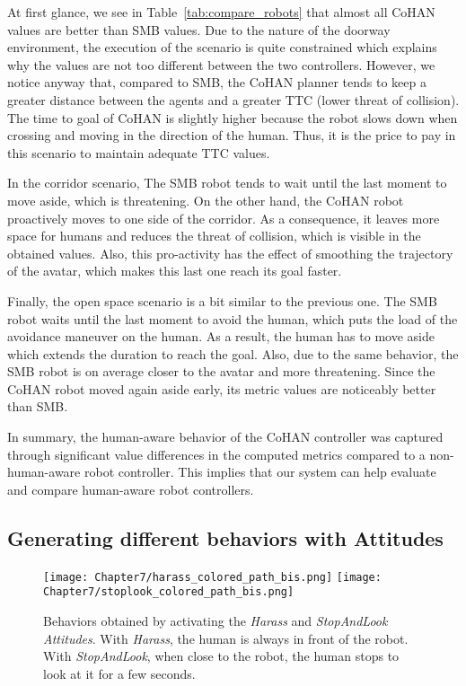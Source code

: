 At first glance, we see in Table~\ref{tab:compare_robots} that almost all CoHAN values are better than SMB values. Due to the nature of the doorway environment, the execution of the scenario is quite constrained which explains why the values are not too different between the two controllers. However, we notice anyway that, compared to SMB, the CoHAN planner tends to keep a greater distance between the agents and a greater TTC (lower threat of collision). The time to goal of CoHAN is slightly higher because the robot slows down when crossing and moving in the direction of the human. Thus, it is the price to pay in this scenario to maintain adequate TTC values.

In the corridor scenario, The SMB robot tends to wait until the last moment to move aside, which is threatening. On the other hand, the CoHAN robot proactively moves to one side of the corridor. As a consequence, it leaves more space for humans and reduces the threat of collision, which is visible in the obtained values. Also, this pro-activity has the effect of smoothing the trajectory of the avatar, which makes this last one reach its goal faster.

Finally, the open space scenario is a bit similar to the previous one. The SMB robot waits until the last moment to avoid the human, which puts the load of the avoidance maneuver on the human. As a result, 
the human has to move aside which extends the duration to reach the goal. Also, due to the same behavior, the SMB robot is on average closer to the avatar and more threatening. Since the CoHAN robot moved again aside early, its metric values are noticeably better than SMB.

In summary, the human-aware behavior of the CoHAN controller was captured through significant value differences in the computed metrics compared to a non-human-aware robot controller. This implies that our system can help evaluate and compare human-aware robot controllers.

\subsection{Generating different behaviors with Attitudes}

\begin{figure}
    \centering
    \texttt{[image: Chapter7/harass\_colored\_path\_bis.png]}
    \texttt{[image: Chapter7/stoplook\_colored\_path\_bis.png]}
    \caption{
    Behaviors obtained by activating the \textit{Harass} and \textit{StopAndLook Attitudes}. 
    With \textit{Harass}, the human is always in front of the robot.
    With \textit{StopAndLook}, when close to the robot, the human stops to look at it for a few seconds.
    }
    \label{fig:attitudes}
    \vspace{-0.3cm}
\end{figure}

